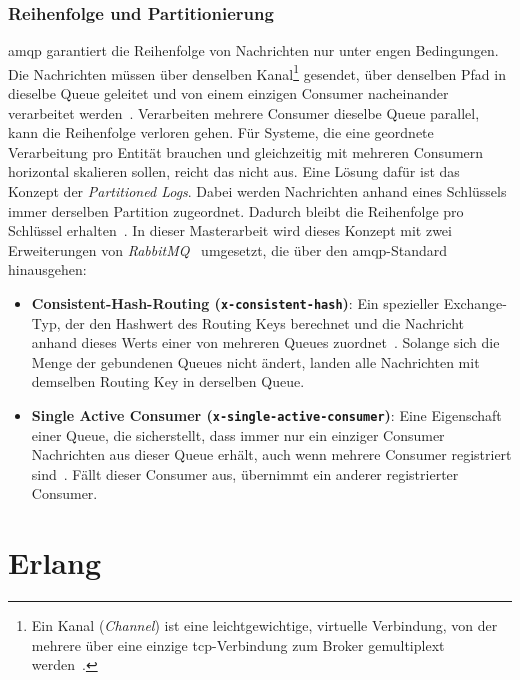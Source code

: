 \newpage

\subsubsection{Reihenfolge und Partitionierung}

\gls{amqp} garantiert die Reihenfolge von Nachrichten nur unter engen Bedingungen. Die Nachrichten müssen über denselben Kanal\footnote{Ein Kanal (\textit{Channel}) ist eine leichtgewichtige, virtuelle Verbindung, von der mehrere über eine einzige \gls{tcp}-Verbindung zum Broker gemultiplext werden~\citep{amqp091}.} gesendet, über denselben Pfad in dieselbe Queue geleitet und von einem einzigen Consumer nacheinander verarbeitet werden~\citep{amqp091}. Verarbeiten mehrere Consumer dieselbe Queue parallel, kann die Reihenfolge verloren gehen. Für Systeme, die eine geordnete Verarbeitung pro Entität brauchen und gleichzeitig mit mehreren Consumern horizontal skalieren sollen, reicht das nicht aus. Eine Lösung dafür ist das Konzept der \textit{Partitioned Logs}. Dabei werden Nachrichten anhand eines Schlüssels immer derselben Partition zugeordnet. Dadurch bleibt die Reihenfolge pro Schlüssel erhalten~\citep{kleppmann2017designing}. In dieser Masterarbeit wird dieses Konzept mit zwei Erweiterungen von \textit{RabbitMQ}~\citep{rabbitmq_broker} umgesetzt, die über den \gls{amqp}-Standard hinausgehen:

\begin{itemize}
    \item \textbf{Consistent-Hash-Routing (\texttt{x-consistent-hash})}: Ein spezieller Ex\-change-Typ, der den Hashwert des Routing Keys berechnet und die Nachricht anhand dieses Werts einer von mehreren Queues zuordnet~\citep{rabbitmq_consistent_hash_exchange}. Solange sich die Menge der gebundenen Queues nicht ändert, landen alle Nachrichten mit demselben Routing Key in derselben Queue.

    \item \textbf{Single Active Consumer (\texttt{x-single-active-consumer})}: Eine Eigenschaft einer Queue, die sicherstellt, dass immer nur ein einziger Consumer Nachrichten aus dieser Queue erhält, auch wenn mehrere Consumer registriert sind~\citep{cogoluegnes2022rabbitmq}. Fällt dieser Consumer aus, übernimmt ein anderer registrierter Consumer.
\end{itemize}

\section{Erlang}
\label{sec:grundlagen-erlang}


